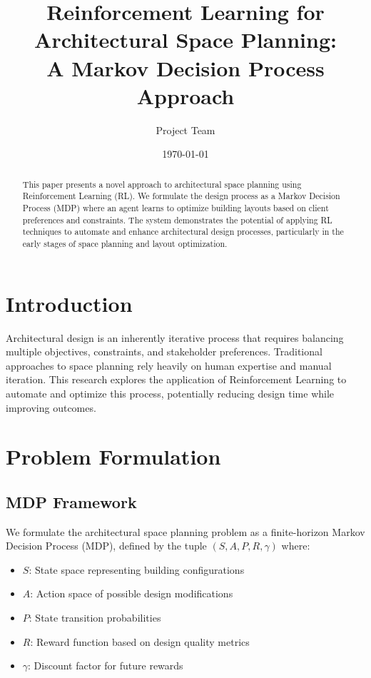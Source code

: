 \documentclass[12pt]{article}
\title{Reinforcement Learning for Architectural Space Planning: \\
A Markov Decision Process Approach}
\author{Project Team}
\date{\today}
\begin{document}
\maketitle

\begin{abstract}
This paper presents a novel approach to architectural space planning using Reinforcement Learning (RL). We formulate the design process as a Markov Decision Process (MDP) where an agent learns to optimize building layouts based on client preferences and constraints. The system demonstrates the potential of applying RL techniques to automate and enhance architectural design processes, particularly in the early stages of space planning and layout optimization.
\end{abstract}

\section{Introduction}
Architectural design is an inherently iterative process that requires balancing multiple objectives, constraints, and stakeholder preferences. Traditional approaches to space planning rely heavily on human expertise and manual iteration. This research explores the application of Reinforcement Learning to automate and optimize this process, potentially reducing design time while improving outcomes.

\section{Problem Formulation}
\subsection{MDP Framework}
We formulate the architectural space planning problem as a finite-horizon Markov Decision Process (MDP), defined by the tuple $(S, A, P, R, \gamma)$ where:
\begin{itemize}
    \item $S$: State space representing building configurations
    \item $A$: Action space of possible design modifications
    \item $P$: State transition probabilities
    \item $R$: Reward function based on design quality metrics
    \item $\gamma$: Discount factor for future rewards
\end{itemize}
\end{document}

